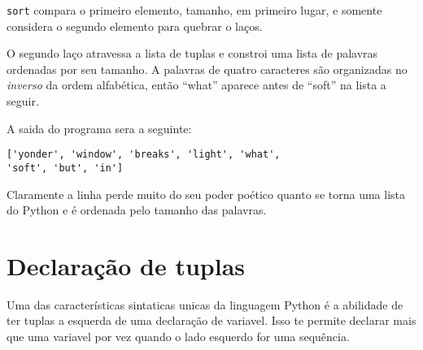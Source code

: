 {\tt sort} compara o primeiro elemento, tamanho, em primeiro lugar, e
somente considera o segundo elemento para quebrar o laços.


O segundo laço atravessa a lista de tuplas e constroi uma lista de 
palavras ordenadas por seu tamanho. A palavras de quatro caracteres
são organizadas no {\em inverso} da ordem alfabética, então ``what''
aparece antes de ``soft'' na lista a seguir.

A saida do programa sera a seguinte:
%
\beforeverb
\begin{verbatim}
['yonder', 'window', 'breaks', 'light', 'what', 
'soft', 'but', 'in']
\end{verbatim}
\afterverb
%
Claramente a linha perde muito do seu poder poético
quanto se torna uma lista do Python e é ordenada
pelo tamanho das palavras.

\section{Declaração de tuplas}
\label{tuple assignment}


Uma das características sintaticas unicas da linguagem Python é
a abilidade de ter tuplas a esquerda de uma declaração de variavel.
Isso te permite declarar mais que uma variavel por vez quando o
lado esquerdo for uma sequência.

